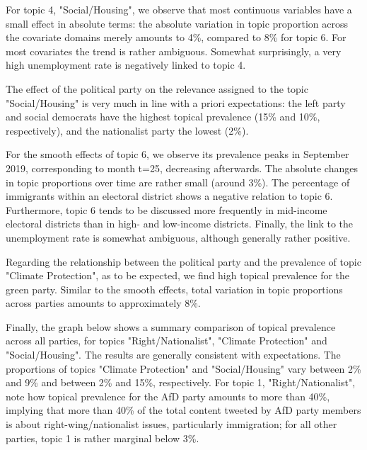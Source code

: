 For topic 4, "Social/Housing", we observe that most continuous variables have a small effect in absolute terms: the absolute variation in topic proportion across the covariate domains merely amounts to 4\%, compared to 8\% for topic 6. For most covariates the trend is rather ambiguous. Somewhat surprisingly, a very high unemployment rate is negatively linked to topic 4.

The effect of the political party on the relevance assigned to the topic "Social/Housing" is very much in line with a priori expectations: the left party and social democrats have the highest topical prevalence (15\% and 10\%, respectively), and the nationalist party the lowest (2\%).

For the smooth effects of topic 6, we observe its prevalence peaks in September 2019, corresponding to month t=25, decreasing afterwards. The absolute changes in topic proportions over time are rather small (around 3\%). The percentage of immigrants within an electoral district shows a negative relation to topic 6. Furthermore, topic 6 tends to be discussed more frequently in mid-income electoral districts than in high- and low-income districts. Finally, the link to the unemployment rate is somewhat ambiguous, although generally rather positive.

Regarding the relationship between the political party and the prevalence of topic "Climate Protection", as to be expected, we find high topical prevalence for the green party. Similar to the smooth effects, total variation in topic proportions across parties amounts to approximately 8\%.

Finally, the graph below shows a summary comparison of topical prevalence across all parties, for topics "Right/Nationalist", "Climate Protection" and "Social/Housing". The results are generally consistent with expectations. The proportions of topics "Climate Protection" and "Social/Housing" vary between 2\% and 9\% and between 2\% and 15\%, respectively. For topic 1, "Right/Nationalist", note how topical prevalence for the AfD party amounts to more than 40\%, implying that more than 40\% of the total content tweeted by AfD party members is about right-wing/nationalist issues, particularly immigration; for all other parties, topic 1 is rather marginal below 3\%.

